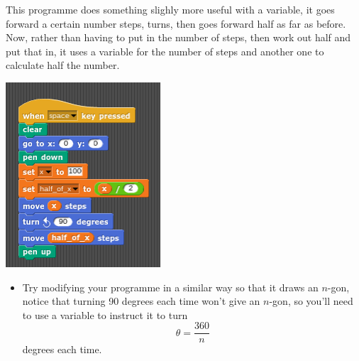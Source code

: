 \documentclass[11pt,a4paper]{scrartcl}
\begin{document}
This programme does something slighly more useful with a variable, it
goes forward a certain number steps, turns, then goes forward half as
far as before. Now, rather than having to put in the number of steps,
then work out half and put that in, it uses a variable for the number
of steps and another one to calculate half the number. 
\begin{center}
\includegraphics{line_half_line.png}
\end{center}
\begin{itemize}
\item Try modifying your programme in a similar way so that it draws an
$n$-gon, notice that turning 90 degrees each time won't give an
$n$-gon, so you'll need to use a variable to instruct it to turn
$$
\theta=\frac{360}{n}
$$
degrees each time.
\end{itemize}
\end{document}
